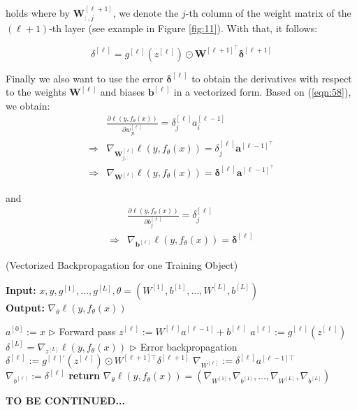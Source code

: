 holds where by $\boldsymbol{W}_{:,j}^{[\ell +1]}$, we denote the $j$-th column of the weight matrix of the $(\ell +1)$-th layer (see example in Figure \ref{fig:11}). With that, it follows:

\begin{equation}
    \boxed{
    \delta^{[\ell]} = g^{[\ell]}(z^{[\ell]}) \odot \boldsymbol{W}^{[\ell+1]^\top} \boldsymbol{\delta}^{[\ell+1]} }
    \label{eqn:79}
\end{equation}

Finally we also want to use the error $\boldsymbol{\delta}^{[\ell]}$ to obtain the derivatives with respect to the weights $\boldsymbol{W}^{[\ell]}$ and biases $\boldsymbol{b}^{[\ell]}$ in a vectorized form. Based on (\ref{eqn:58}), we obtain:
\begin{equation}
    \begin{aligned}
    &\frac{\partial \ell(y, f_\theta(x))}{\partial w_{ji}^{[\ell]}} = \delta_j^{[\ell]} a_i^{[\ell-1]}\\
    \Rightarrow &\nabla_{\boldsymbol{W}_{j,:}^{[\ell]}} \ell(y, f_\theta(x)) = \delta_j^{[\ell]} \boldsymbol{a}^{[\ell-1]^\top}\\
    \Rightarrow &\boxed{\nabla_{\boldsymbol{W}^{[\ell]}} \ell(y, f_\theta(x)) = \boldsymbol{\delta}^{[\ell]} \boldsymbol{a}^{[\ell-1]^\top}}
    \end{aligned}
    \label{eqn:80}
\end{equation}

and
\begin{equation}
    \begin{aligned}
    &\frac{\partial \ell(y, f_\theta(x))}{\partial b_j^{[\ell]}} = \delta_j^{[\ell]} \\
    \Rightarrow &\boxed{\nabla_{\boldsymbol{b}^{[\ell]}} \ell(y, f_\theta(x)) = \boldsymbol{\delta}^{[\ell]}}
    \end{aligned}
    \label{eqn:81}
\end{equation}

\begin{algorithm}
\caption{(Vectorized Backpropagation for one Training Object)}
\textbf{Input:} $x, y, g^{[1]}, \dots, g^{[L]}, \theta = (W^{[1]}, b^{[1]}, \dots, W^{[L]}, b^{[L]})$ \\
\textbf{Output:} $\nabla_\theta \ell(y, f_\theta(x))$\\

\begin{algorithmic}[1]
\STATE $a^{[0]} := x$ \hfill $\triangleright$ Forward pass
    \STATE $z^{[\ell]} := W^{[\ell]} a^{[\ell-1]} + b^{[\ell]}$
    \STATE $a^{[\ell]} := g^{[\ell]}(z^{[\ell]})$
\ENDFOR
\STATE
\STATE $\delta^{[L]} = \nabla_{z^{[L]}} \ell(y, f_\theta(x))$ \hfill $\triangleright$ Error backpropagation
    \STATE $\delta^{[\ell]} := g^{[\ell]'}(z^{[\ell]}) \odot W^{[\ell+1]\top} \delta^{[\ell+1]}$
    \STATE $\nabla_{W^{[\ell]}} := \delta^{[\ell]} a^{[\ell-1]\top}$
    \STATE $\nabla_{b^{[\ell]}} := \delta^{[\ell]}$
\ENDFOR
\STATE
\STATE \textbf{return} $\nabla_\theta \ell(y, f_\theta(x)) = (\nabla_{W^{[1]}}, \nabla_{b^{[1]}}, \dots, \nabla_{W^{[L]}}, \nabla_{b^{[L]}})$
\end{algorithmic}
\end{algorithm}


\vspace{5em}
\textbf{TO BE CONTINUED...}


